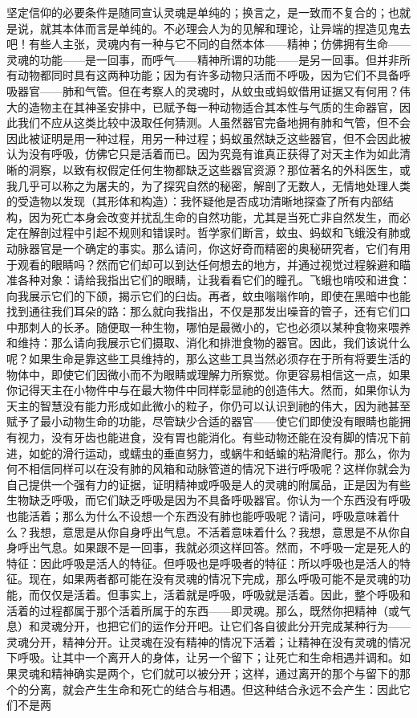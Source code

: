 坚定信仰的必要条件是随同宣认灵魂是单纯的；换言之，是一致而不复合的；也就是说，就其本体而言是单纯的。不必理会人为的见解和理论，让异端的捏造见鬼去吧！有些人主张，灵魂内有一种与它不同的自然本体——精神；仿佛拥有生命——灵魂的功能——是一回事，而呼气——精神所谓的功能——是另一回事。但并非所有动物都同时具有这两种功能；因为有许多动物只活而不呼吸，因为它们不具备呼吸器官——肺和气管。但在考察人的灵魂时，从蚊虫或蚂蚁借用证据又有何用？伟大的造物主在其神圣安排中，已赋予每一种动物适合其本性与气质的生命器官，因此我们不应从这类比较中汲取任何猜测。人虽然器官完备地拥有肺和气管，但不会因此被证明是用一种过程，用另一种过程；蚂蚁虽然缺乏这些器官，但不会因此被认为没有呼吸，仿佛它只是活着而已。因为究竟有谁真正获得了对天主作为如此清晰的洞察，以致有权假定任何生物都缺乏这些器官资源？那位著名的外科医生，或我几乎可以称之为屠夫的，为了探究自然的秘密，解剖了无数人，无情地处理人类的受造物以发现（其形体和构造）：我怀疑他是否成功清晰地探查了所有内部结构，因为死亡本身会改变并扰乱生命的自然功能，尤其是当死亡非自然发生，而必定在解剖过程中引起不规则和错误时。哲学家们断言，蚊虫、蚂蚁和飞蛾没有肺或动脉器官是一个确定的事实。那么请问，你这好奇而精密的奥秘研究者，它们有用于观看的眼睛吗？然而它们却可以到达任何想去的地方，并通过视觉过程躲避和瞄准各种对象：请给我指出它们的眼睛，让我看看它们的瞳孔。飞蛾也啃咬和进食：向我展示它们的下颌，揭示它们的臼齿。再者，蚊虫嗡嗡作响，即使在黑暗中也能找到通往我们耳朵的路：那么就向我指出，不仅是那发出噪音的管子，还有它们口中那刺人的长矛。随便取一种生物，哪怕是最微小的，它也必须以某种食物来喂养和维持：那么请向我展示它们摄取、消化和排泄食物的器官。因此，我们该说什么呢？如果生命是靠这些工具维持的，那么这些工具当然必须存在于所有将要生活的物体中，即使它们因微小而不为眼睛或理解力所察觉。你更容易相信这一点，如果你记得天主在小物件中与在最大物件中同样彰显祂的创造伟大。然而，如果你认为天主的智慧没有能力形成如此微小的粒子，你仍可以认识到祂的伟大，因为祂甚至赋予了最小动物生命的功能，尽管缺少合适的器官——使它们即使没有眼睛也能拥有视力，没有牙齿也能进食，没有胃也能消化。有些动物还能在没有脚的情况下前进，如蛇的滑行运动，或蠕虫的垂直努力，或蜗牛和蛞蝓的粘滑爬行。那么，你为何不相信同样可以在没有肺的风箱和动脉管道的情况下进行呼吸呢？这样你就会为自己提供一个强有力的证据，证明精神或呼吸是人的灵魂的附属品，正是因为有些生物缺乏呼吸，而它们缺乏呼吸是因为不具备呼吸器官。你认为一个东西没有呼吸也能活着；那么为什么不设想一个东西没有肺也能呼吸呢？请问，呼吸意味着什么？我想，意思是从你自身呼出气息。不活着意味着什么？我想，意思是不从你自身呼出气息。如果跟不是一回事，我就必须这样回答。然而，不呼吸一定是死人的特征：因此呼吸是活人的特征。但呼吸也是呼吸者的特征：所以呼吸也是活人的特征。现在，如果两者都可能在没有灵魂的情况下完成，那么呼吸可能不是灵魂的功能，而仅仅是活着。但事实上，活着就是呼吸，呼吸就是活着。因此，整个呼吸和活着的过程都属于那个活着所属于的东西——即灵魂。那么，既然你把精神（或气息）和灵魂分开，也把它们的运作分开吧。让它们各自彼此分开完成某种行为——灵魂分开，精神分开。让灵魂在没有精神的情况下活着；让精神在没有灵魂的情况下呼吸。让其中一个离开人的身体，让另一个留下；让死亡和生命相遇并调和。如果灵魂和精神确实是两个，它们就可以被分开；这样，通过离开的那个与留下的那个的分离，就会产生生命和死亡的结合与相遇。但这种结合永远不会产生：因此它们不是两
